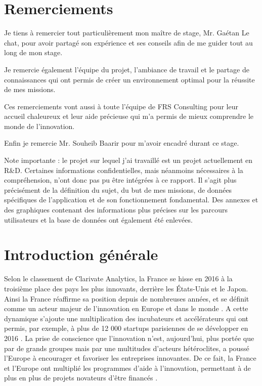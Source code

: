\documentclass[french]{article}
\begin{document}
\renewcommand*\contentsname{Sommaire}

{\hypersetup{hidelinks}
    \tableofcontents
    
\clearpage

\section{Remerciements}

Je tiens à remercier tout particulièrement mon maître de stage, Mr. Gaétan Le chat, pour avoir partagé son expérience et ses conseils afin de me guider tout au long de mon stage.

Je remercie également l'équipe du projet, l'ambiance de travail et le partage de connaissances qui ont permis de créer un environnement optimal pour la réussite de mes missions.

Ces remerciements vont aussi à toute l'équipe de FRS Consulting pour leur accueil chaleureux et leur aide précieuse qui m'a permis de mieux comprendre le monde de l'innovation.

Enfin je remercie Mr. Souheib Baarir pour m'avoir encadré durant ce stage.

\clearpage

Note importante : le projet sur lequel j'ai travaillé est un projet actuellement en R\&D. Certaines informations confidentielles, mais néanmoins nécessaires à la compréhension, n'ont donc pas pu être intégrées à ce rapport. Il s'agit plus précisément de la définition du sujet, du but de mes missions, de données spécifiques de l'application et de son fonctionnement fondamental. Des annexes et des graphiques contenant des informations plus précises sur les parcours utilisateurs et la base de données ont également été enlevées.

\section{Introduction générale}

Selon le classement de Clarivate Analytics, la France se hisse en 2016 à la troisième place des pays les plus innovants, derrière les États-Unis et le Japon. Ainsi la France réaffirme sa position depuis de nombreuses années, et se définit comme un acteur majeur de l'innovation en Europe et dans le monde \cite{clarivate}. 
\newline{}
A cette dynamique s'ajoute une multiplication des incubateurs et accélérateurs qui ont permis, par exemple, à plus de 12 000 startups parisiennes de se développer en 2016 \cite{france-startup, france-startup2}.
\newline{}
La prise de conscience que l'innovation n'est, aujourd'hui, plus portée que par de grands groupes mais par une multitudes d'acteurs hétéroclites, a poussé l'Europe à encourager et favoriser les entreprises innovantes. De ce fait, la France et l'Europe ont multiplié les programmes d'aide à l'innovation, permettant à de plus en plus de projets novateurs d'être financés \cite{ent-gouv}.

}
\end{document}
